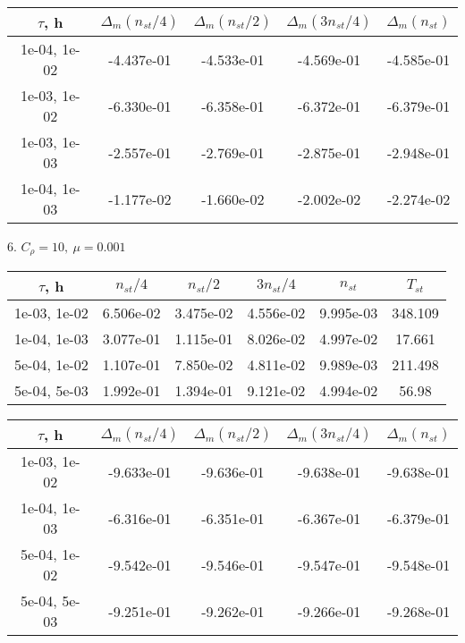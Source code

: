 \begin{center}
	\begin{tabular}{ |c|c|c|c|c| } 
		\hline
		$\tau$, h & $\Delta_m (n_{st}/ 4)$ & $\Delta_m (n_{st}/ 2)$ & $\Delta_m (3n_{st}/ 4)$ & $\Delta_m (n_{st})$ \\ 
		\hline
		1e-04, 1e-02 & -4.437e-01 & -4.533e-01 & -4.569e-01 & -4.585e-01 \\ 
		\hline
		1e-03, 1e-02 & -6.330e-01 & -6.358e-01 & -6.372e-01 & -6.379e-01 \\ 
		\hline
		1e-03, 1e-03 & -2.557e-01 & -2.769e-01 & -2.875e-01 & -2.948e-01 \\ 
		\hline
		1e-04, 1e-03 & -1.177e-02 & -1.660e-02 & -2.002e-02 & -2.274e-02 \\ 
		\hline
	\end{tabular}
\end{center}

6. $C_{\rho} = 10, \ \mu = 0.001$
\begin{center}
	\begin{tabular}{ |c|c|c|c|c|c| } 
		\hline
		$\tau$, h & $n_{st}/ 4$ & $n_{st}/ 2$ & $3n_{st}/ 4$ & $n_{st}$ & $T_{st}$ \\ 
		\hline
		1e-03, 1e-02 & 6.506e-02 & 3.475e-02 & 4.556e-02 & 9.995e-03 & 348.109\\ 
		\hline
		1e-04, 1e-03 & 3.077e-01 & 1.115e-01 & 8.026e-02 & 4.997e-02 & 17.661\\ 
		\hline
		5e-04, 1e-02 & 1.107e-01 & 7.850e-02 & 4.811e-02 & 9.989e-03 & 211.498\\ 
		\hline
		5e-04, 5e-03 & 1.992e-01 & 1.394e-01 & 9.121e-02 & 4.994e-02 & 56.98\\ 
		\hline
	\end{tabular}
\end{center}

\begin{center}
	\begin{tabular}{ |c|c|c|c|c| } 
		\hline
		$\tau$, h & $\Delta_m (n_{st}/ 4)$ & $\Delta_m (n_{st}/ 2)$ & $\Delta_m (3n_{st}/ 4)$ & $\Delta_m (n_{st})$ \\ 
		\hline
		1e-03, 1e-02 & -9.633e-01 & -9.636e-01 & -9.638e-01 & -9.638e-01 \\ 
		\hline
		1e-04, 1e-03 & -6.316e-01 & -6.351e-01 & -6.367e-01 & -6.379e-01 \\ 
		\hline
		5e-04, 1e-02 & -9.542e-01 & -9.546e-01 & -9.547e-01 & -9.548e-01 \\ 
		\hline
		5e-04, 5e-03 & -9.251e-01 & -9.262e-01 & -9.266e-01 & -9.268e-01 \\ 
		\hline
	\end{tabular}
\end{center}

